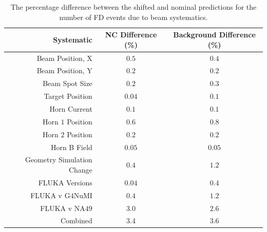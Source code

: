 \begin{table}[htb]
  \begin{center}
    \begin{tabular}{r c c}
      \hline\hline
      Systematic & NC Difference (\%) & Background Difference (\%) \\
      \hline
      Beam Position, X & $0.5$ & $0.4$ \\
      Beam Position, Y & $0.2$ & $0.2$ \\
      Beam Spot Size & $0.2$ & $0.3$ \\
      Target Position & $0.04$ & $0.1$ \\
      Horn Current & $0.1$ & $0.1$ \\
      Horn $1$ Position & $0.6$ & $0.8$ \\
      Horn $2$ Position & $0.2$ & $0.2$ \\
      Horn B Field & $0.05$ & $0.05$ \\
      Geometry Simulation Change & $0.4$ & $1.2$ \\
      FLUKA Versions & $0.04$ & $0.4$ \\
      FLUKA v G$4$NuMI & $0.4$ & $1.2$ \\
      FLUKA v NA$49$ & $3.0$ & $2.6$ \\
      \hline
      Combined & $3.4$ & $3.6$ \\
      \hline
    \end{tabular}
    \caption[Beam Systematic Uncertainties]{The percentage difference between the shifted and nominal predictions for the number of FD events due to beam systematics.}
    \label{tab:SystBeam}
  \end{center}
\end{table}

